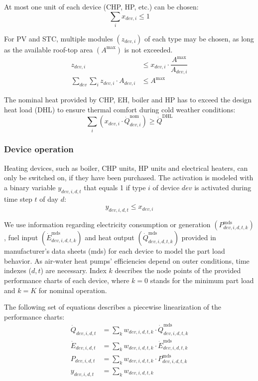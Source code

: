 At most one unit of each device (CHP, HP, etc.) can be chosen:
\begin{equation}
	\sum\limits_{i} x_{dev,i} \le 1
\end{equation}

For PV and STC, multiple modules $\left(z_{dev,i}\right)$ of each type may be chosen, as long as the available roof-top area $\left(A^\mathrm{max}\right)$ is not exceeded.
\begin{align}
	z_{dev,i} &\le x_{dev,i} \cdot \dfrac{A^\mathrm{max}}{A_{dev,i}}\\
	\sum\limits_{dev}\sum\limits_{i} z_{dev,i} \cdot A_{dev,i} &\le A^\mathrm{max}
\end{align}

The nominal heat provided by CHP, EH, boiler and HP has to exceed the design heat load (DHL) to ensure thermal comfort during cold weather conditions:
\begin{equation}
	\sum\limits_{i} \left(x_{dev,i} \cdot \dot{Q}^\mathrm{nom}_{dev,i}\right) \ge \dot{Q}^\mathrm{DHL}
\end{equation}

\subsubsection{Device operation}

Heating devices, such as boiler, CHP units, HP units and electrical heaters, can only be switched on, if they have been purchased.
The activation is modeled with a binary variable $y_{dev,i,d,t}$ that equals 1 if type $i$ of device $dev$ is activated during time step $t$ of day $d$:
\begin{equation}
	y_{dev,i,d,t} \le x_{dev,i}
\end{equation}

We use information regarding electricity consumption or generation $\left(P^\mathrm{mds}_{dev,i,d,t,k}\right)$, fuel input $\left(\dot{E}^\mathrm{mds}_{dev,i,d,t,k}\right)$ and heat output $\left(\dot{Q}^\mathrm{mds}_{dev,i,d,t,k}\right)$ provided in manufacturer's data sheets (mds) for each device to model the part load behavior.
As air-water heat pumps' efficiencies depend on outer conditions, time indexes ($d,t$) are necessary.
Index $k$ describes the node points of the provided performance charts of each device, where $k=0$ stands for the minimum part load and $k=K$ for nominal operation.

The following set of equations describes a piecewise linearization of the performance charts:
\begin{align}
	\dot{Q}_{dev,i,d,t} &= \sum\limits_{k} w_{dev,i,d,t,k} \cdot \dot{Q}^\mathrm{mds}_{dev,i,d,t,k}\\
	\dot{E}_{dev,i,d,t} &= \sum\limits_{k} w_{dev,i,d,t,k} \cdot \dot{E}^\mathrm{mds}_{dev,i,d,t,k}\\
	P_{dev,i,d,t} &= \sum\limits_{k} w_{dev,i,d,t,k} \cdot P^\mathrm{mds}_{dev,i,d,t,k}\\
	y_{dev,i,d,t} &= \sum\limits_{k} w_{dev,i,d,t,k}
\end{align}

